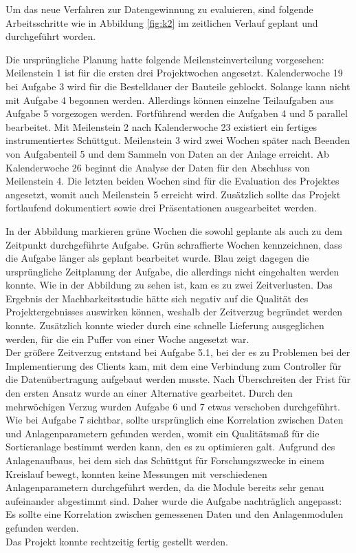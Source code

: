 Um das neue Verfahren zur Datengewinnung zu evaluieren, sind folgende Arbeitsschritte wie in Abbildung \ref{fig:k2} im zeitlichen Verlauf geplant und durchgeführt worden.

Die ursprüngliche Planung hatte folgende Meilensteinverteilung vorgesehen: Meilenstein 1 ist für die ersten drei Projektwochen angesetzt. Kalenderwoche 19 bei Aufgabe 3 wird für die Bestelldauer der Bauteile geblockt. Solange kann nicht mit Aufgabe 4 begonnen werden. Allerdings können einzelne Teilaufgaben aus Aufgabe 5 vorgezogen werden. Fortführend werden die Aufgaben 4 und 5 parallel bearbeitet. Mit Meilenstein 2 nach Kalenderwoche 23 existiert ein fertiges instrumentiertes Schüttgut. Meilenstein 3 wird zwei Wochen später nach Beenden von Aufgabenteil 5 und dem Sammeln von Daten an der Anlage erreicht. Ab Kalenderwoche 26 beginnt die Analyse der Daten für den Abschluss von Meilenstein 4. Die letzten beiden Wochen sind für die Evaluation des Projektes angesetzt, womit auch Meilenstein 5 erreicht wird. Zusätzlich sollte das Projekt fortlaufend dokumentiert sowie drei Präsentationen ausgearbeitet werden.

In der Abbildung markieren grüne Wochen die sowohl geplante als auch zu dem Zeitpunkt durchgeführte Aufgabe. Grün schraffierte Wochen kennzeichnen, dass die Aufgabe länger als geplant bearbeitet wurde. Blau zeigt dagegen die ursprüngliche Zeitplanung der Aufgabe, die allerdings nicht eingehalten werden konnte. Wie in der Abbildung zu sehen ist, kam es zu zwei Zeitverlusten. Das Ergebnis der Machbarkeitsstudie hätte sich negativ auf die Qualität des Projektergebnisses auswirken können, weshalb der Zeitverzug begründet werden konnte. Zusätzlich konnte wieder durch eine schnelle Lieferung ausgeglichen werden, für die ein Puffer von einer Woche angesetzt war. \\
Der größere Zeitverzug entstand bei Aufgabe 5.1, bei der es zu Problemen bei der Implementierung des Clients kam, mit dem eine Verbindung zum Controller für die Datenübertragung aufgebaut werden musste. Nach Überschreiten der Frist für den ersten Ansatz wurde an einer Alternative gearbeitet. Durch den mehrwöchigen Verzug wurden Aufgabe 6 und 7  etwas verschoben durchgeführt. \\
Wie bei Aufgabe 7 sichtbar, sollte ursprünglich eine Korrelation zwischen Daten und Anlagenparametern gefunden werden, womit ein Qualitätsmaß für die Sortieranlage bestimmt werden kann, den es zu optimieren galt. Aufgrund des Anlagenaufbaus, bei dem sich das Schüttgut für Forschungszwecke in einem Kreislauf bewegt, konnten keine Messungen mit verschiedenen Anlagenparametern durchgeführt werden, da die Module bereits sehr genau aufeinander abgestimmt sind. Daher wurde die Aufgabe nachträglich angepasst: Es sollte eine Korrelation zwischen gemessenen Daten und den Anlagenmodulen gefunden werden. \\
Das Projekt konnte rechtzeitig fertig gestellt werden.

